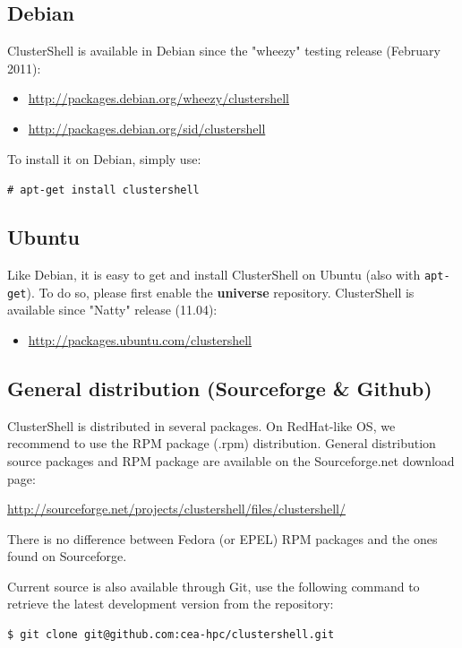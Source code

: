 \documentclass[english,a4paper]{csuserguide}
\begin{document}
\subsection{Debian}

ClusterShell is available in Debian since the "wheezy" testing release (February 2011):
\begin{itemize}
\item{\url{http://packages.debian.org/wheezy/clustershell}}
\item{\url{http://packages.debian.org/sid/clustershell}}
\end{itemize}

To install it on Debian, simply use:

\verb+# apt-get install clustershell+


\subsection{Ubuntu}

Like Debian, it is easy to get and install ClusterShell on Ubuntu (also with \verb+apt-get+). To do so, please first enable the \textbf{universe} repository. ClusterShell is available since "Natty" release (11.04):
\begin{itemize}
\item{\url{http://packages.ubuntu.com/clustershell}}
\end{itemize}

\subsection{General distribution (Sourceforge \& Github)}

ClusterShell is distributed in several packages. On RedHat-like OS, we recommend to use the RPM  package (.rpm) distribution. General distribution source packages and RPM package are available on the Sourceforge.net download page:

\url{http://sourceforge.net/projects/clustershell/files/clustershell/}

There is no difference between Fedora (or EPEL) RPM packages and the ones found on Sourceforge.

\medskip

Current source is also available through Git, use the following command to retrieve the latest development version from the repository:
\begin{verbatim}
$ git clone git@github.com:cea-hpc/clustershell.git
\end{verbatim}
\end{document}

